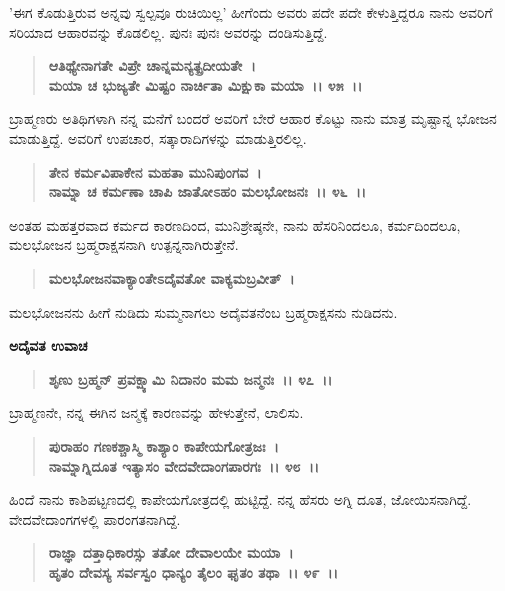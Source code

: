 'ಈಗ ಕೊಡುತ್ತಿರುವ ಅನ್ನವು ಸ್ವಲ್ಪವೂ ರುಚಿಯಿಲ್ಲ' ಹೀಗೆಂದು ಅವರು ಪದೇ ಪದೇ ಕೇಳುತ್ತಿದ್ದರೂ ನಾನು ಅವರಿಗೆ ಸರಿಯಾದ ಆಹಾರವನ್ನು ಕೊಡಲಿಲ್ಲ. ಪುನಃ ಪುನಃ ಅವರನ್ನು ದಂಡಿಸುತ್ತಿದ್ದೆ.

\begin{verse}
\textbf{ಆತಿಥ್ಯೇನಾಗತೇ ವಿಪ್ರೇ ಚಾನ್ನಮನ್ಯತ್ಪ್ರದೀಯತೇ~।}\\\textbf{ಮಯಾ ಚ ಭುಜ್ಯತೇ ಮಿಷ್ಟಂ ನಾರ್ಚಿತಾ ಮಿಕ್ಷುಕಾ ಮಯಾ~।। ೪೫~।।}
\end{verse}

ಬ್ರಾಹ್ಮಣರು ಅತಿಥಿಗಳಾಗಿ ನನ್ನ ಮನೆಗೆ ಬಂದರೆ ಅವರಿಗೆ ಬೇರೆ ಆಹಾರ ಕೊಟ್ಟು ನಾನು ಮಾತ್ರ ಮೃಷ್ಟಾನ್ನ ಭೋಜನ ಮಾಡುತ್ತಿದ್ದೆ. ಅವರಿಗೆ ಉಪಚಾರ, ಸತ್ಕಾರಾದಿಗಳನ್ನು ಮಾಡು\break ತ್ತಿರಲಿಲ್ಲ.

\begin{verse}
\textbf{ತೇನ ಕರ್ಮವಿಪಾಕೇನ ಮಹತಾ ಮುನಿಪುಂಗವ~।}\\\textbf{ನಾಮ್ನಾ ಚ ಕರ್ಮಣಾ ಚಾಪಿ ಜಾತೋಽಹಂ ಮಲಭೋಜನಃ~।। ೪೬~।।}
\end{verse}

ಅಂತಹ ಮಹತ್ತರವಾದ ಕರ್ಮದ ಕಾರಣದಿಂದ, ಮುನಿಶ್ರೇಷ್ಠನೇ, ನಾನು ಹೆಸರಿನಿಂದಲೂ, ಕರ್ಮದಿಂದಲೂ, ಮಲಭೋಜನ ಬ್ರಹ್ಮರಾಕ್ಷಸನಾಗಿ ಉತ್ಪನ್ನನಾಗಿರುತ್ತೇನೆ.

\begin{verse}
\textbf{ಮಲಭೋಜನವಾಕ್ಯಾಂತೇಽದೈವತೋ ವಾಕ್ಯಮಬ್ರವೀತ್~।}
\end{verse}

ಮಲಭೋಜನನು ಹೀಗೆ ನುಡಿದು ಸುಮ್ಮನಾಗಲು ಅದೈವತನೆಂಬ ಬ್ರಹ್ಮರಾಕ್ಷಸನು ನುಡಿದನು.

\newpage

\begin{flushleft}
\textbf{ಅದೈವತ ಉವಾಚ}
\end{flushleft}

\begin{verse}
\textbf{ಶೃಣು ಬ್ರಹ್ಮನ್ ಪ್ರವಕ್ಷ್ಯಾಮಿ ನಿದಾನಂ ಮಮ ಜನ್ಮನಃ~।। ೪೭~।।}
\end{verse}

ಬ್ರಾಹ್ಮಣನೇ, ನನ್ನ ಈಗಿನ ಜನ್ಮಕ್ಕೆ ಕಾರಣವನ್ನು ಹೇಳುತ್ತೇನೆ, ಲಾಲಿಸು.

\begin{verse}
\textbf{ಪುರಾಹಂ ಗಣಕಶ್ಚಾಸ್ಮಿ ಕಾಶ್ಯಾಂ ಕಾಪೇಯಗೋತ್ರಜಃ~।}\\\textbf{ನಾಮ್ನಾಗ್ನಿದೂತ ಇತ್ಯಾಸಂ ವೇದವೇದಾಂಗಪಾರಗಃ~।। ೪೮~।।}
\end{verse}

ಹಿಂದೆ ನಾನು ಕಾಶಿಪಟ್ಟಣದಲ್ಲಿ ಕಾಪೇಯಗೋತ್ರದಲ್ಲಿ ಹುಟ್ಟಿದ್ದೆ. ನನ್ನ ಹೆಸರು ಅಗ್ನಿ ದೂತ, ಜೋಯಿಸನಾಗಿದ್ದೆ. ವೇದವೇದಾಂಗಗಳಲ್ಲಿ ಪಾರಂಗತನಾಗಿದ್ದೆ.

\begin{verse}
\textbf{ರಾಜ್ಞಾ ದತ್ತಾಧಿಕಾರಸ್ಸು ತತೋ ದೇವಾಲಯೇ ಮಯಾ~।}\\\textbf{ಹೃತಂ ದೇವಸ್ಯ ಸರ್ವಸ್ವಂ ಧಾನ್ಯಂ ತೈಲಂ ಘೃತಂ ತಥಾ~।। ೪೯~।। }
\end{verse}

